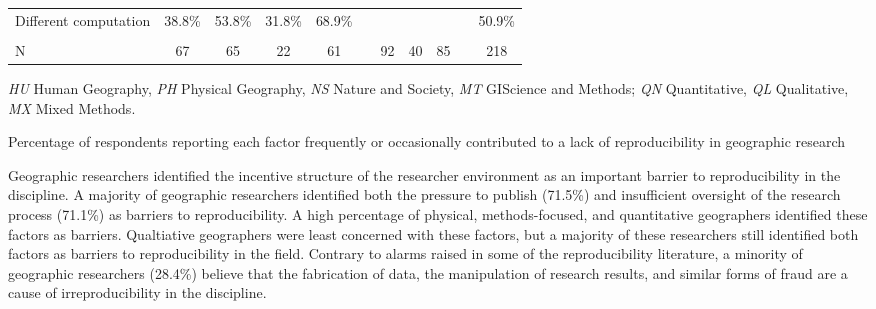 \documentclass[]{interact}
\theoremstyle{plain}%
\theoremstyle{definition}
\theoremstyle{remark}
\begin{document}
\begin{table}[h]
\begin{threeparttable}
\begin{tabular}{l c c c c c c c c c c}
         Different computation              & 38.8\% & 53.8\% & 31.8\% & 68.9\% & & & & & & 50.9\% \\
                                            & & & & & & & & & &\\
         N                                  & 67 & 65 & 22 & 61 & & 92 & 40 & 85 & & 218 \\
        \hline
    \end{tabular}
    \begin{tablenotes}
        \footnotesize
        \item \textit{HU} Human Geography, \textit{PH} Physical Geography, \textit{NS} Nature and Society, \textit{MT} GIScience and Methods; \textit{QN} Quantitative, \textit{QL} Qualitative, \textit{MX} Mixed Methods. 
        \item Percentage of respondents reporting each factor frequently or occasionally contributed to a lack of reproducibility in geographic research
    \end{tablenotes}
    \label{tab:barriers}
    \end{threeparttable}
\end{table}

Geographic researchers identified the incentive structure of the researcher environment as an important barrier to reproducibility in the discipline.
A majority of geographic researchers identified both the pressure to publish (71.5\%) and insufficient oversight of the research process (71.1\%) as barriers to reproducibility.
A high percentage of physical, methods-focused, and quantitative geographers identified these factors as barriers. 
Qualtiative geographers were least concerned with these factors, but a majority of these researchers still identified both factors as barriers to reproducibility in the field.
Contrary to alarms raised in some of the reproducibility literature, a minority of geographic researchers (28.4\%) believe that the fabrication of data, the manipulation of research results, and similar forms of fraud are a cause of irreproducibility in the discipline.
\end{document}
